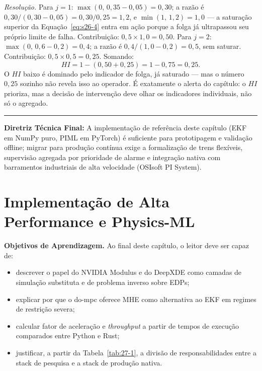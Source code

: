 \documentclass[12pt,a4paper]{article}
\numberwithin{equation}{section}
\numberwithin{table}{section}
\numberwithin{figure}{section}
\begin{document}
{	\emph{Resolução.} Para $j=1$:
	$\max(0,\,0{,}35-0{,}05)=0{,}30$; a razão é
	$0{,}30/(0{,}30-0{,}05)=0{,}30/0{,}25=1{,}2$, e
	$\min(1,\,1{,}2)=1{,}0$ --- a saturação superior da
	Equação~\eqref{eq:s26-4} entra em ação porque a folga já ultrapassou
	seu próprio limite de falha. Contribuição: $0{,}5 \times 1{,}0 =
	0{,}50$. Para $j=2$: $\max(0,\,0{,}6-0{,}2)=0{,}4$; a razão é
	$0{,}4/(1{,}0-0{,}2)=0{,}5$, sem saturar. Contribuição:
	$0{,}5 \times 0{,}5 = 0{,}25$. Somando:
	$$HI = 1 - (0{,}50+0{,}25) = 1 - 0{,}75 = 0{,}25.$$
	O $HI$ baixo é dominado pelo indicador de folga, já saturado --- mas o
	número $0{,}25$ sozinho não revela isso ao operador. É exatamente o
	alerta do capítulo: o $HI$ prioriza, mas a decisão de intervenção deve
	olhar os indicadores individuais, não só o agregado.

	\vspace{1em}
	\hrule
	\vspace{1em}

	\textbf{Diretriz Técnica Final:} A implementação de referência deste capítulo (EKF em NumPy puro, PIML em PyTorch) é suficiente para prototipagem e validação offline; migrar para produção contínua exige a formalização de trens flexíveis, supervisão agregada por prioridade de alarme e integração nativa com barramentos industriais de alta velocidade (OSIsoft PI System).

	\newpage
	
	\clearpage
	\section{Implementação de Alta Performance e Physics-ML}

	\textbf{Objetivos de Aprendizagem.} Ao final deste capítulo, o leitor
	deve ser capaz de:
	\begin{itemize}
		\item descrever o papel do NVIDIA Modulus e do DeepXDE como
		camadas de simulação substituta e de problema inverso sobre
		EDPs;
		\item explicar por que o do-mpc oferece MHE como alternativa ao
		EKF em regimes de restrição severa;
		\item calcular fator de aceleração e \textit{throughput} a
		partir de tempos de execução comparados entre Python e Rust;
		\item justificar, a partir da Tabela~\ref{tab:27-1}, a divisão de
		responsabilidades entre a stack de pesquisa e a stack de
		produção nativa.
	\end{itemize}

}
\end{document}

